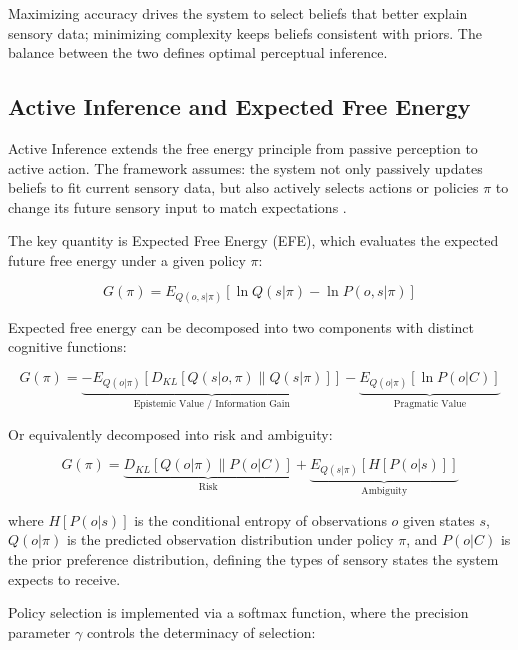 \documentclass[11pt,a4paper]{article}
\begin{document}
Maximizing accuracy drives the system to select beliefs that better explain sensory data; minimizing complexity keeps beliefs consistent with priors. The balance between the two defines optimal perceptual inference.

\subsection{Active Inference and Expected Free Energy}

Active Inference extends the free energy principle from passive perception to active action. The framework assumes: the system not only passively updates beliefs to fit current sensory data, but also actively selects actions or policies $\pi$ to change its future sensory input to match expectations \cite{Friston2017}.

The key quantity is Expected Free Energy (EFE), which evaluates the expected future free energy under a given policy $\pi$:

\begin{equation}
G(\pi) = E_{Q(o, s|\pi)}[\ln Q(s|\pi) - \ln P(o, s|\pi)]
\label{eq:efe}
\end{equation}

Expected free energy can be decomposed into two components with distinct cognitive functions:

\begin{equation}
G(\pi) = \underbrace{-E_{Q(o|\pi)}[D_{KL}[Q(s|o, \pi) \| Q(s|\pi)]]}_{\text{Epistemic Value / Information Gain}} - \underbrace{E_{Q(o|\pi)}[\ln P(o|C)]}_{\text{Pragmatic Value}}
\label{eq:efe_epistemic}
\end{equation}

Or equivalently decomposed into risk and ambiguity:

\begin{equation}
G(\pi) = \underbrace{D_{KL}[Q(o|\pi) \| P(o|C)]}_{\text{Risk}} + \underbrace{E_{Q(s|\pi)}[H[P(o|s)]]}_{\text{Ambiguity}}
\label{eq:efe_risk}
\end{equation}

where $H[P(o|s)]$ is the conditional entropy of observations $o$ given states $s$, $Q(o|\pi)$ is the predicted observation distribution under policy $\pi$, and $P(o|C)$ is the prior preference distribution, defining the types of sensory states the system expects to receive.

Policy selection is implemented via a softmax function, where the precision parameter $\gamma$ controls the determinacy of selection:
\end{document}
